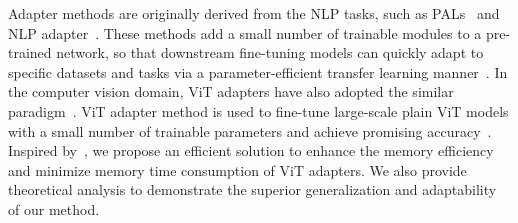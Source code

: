 Adapter methods are originally derived from the NLP tasks, such as PALs~\citep{stickland2019bert} and NLP adapter~\citep{houlsby2019parameter}. These methods add a small number of trainable modules to a pre-trained network, so that downstream fine-tuning models can quickly adapt to specific datasets and tasks via a parameter-efficient transfer learning manner~\citep{hu2022lora,houlsby2019parameter,chen2022vision,shen2023survey}. In the computer vision domain, ViT adapters have also adopted the similar paradigm~\citep{jie2023fact,chen2022vision,shao2023deepfake,luo2023forgery}. 
ViT adapter method is used to fine-tune large-scale plain ViT models with a small number of trainable parameters and achieve promising accuracy~\citep{jie2023fact,li2022exploring,chen2022vision}. 
Inspired by~\citep{he2023simplifying,jie2022convolutional,chen2022vision,liu2023efficientvit,mercea2024time}, we propose an efficient solution to enhance the memory efficiency and minimize memory time consumption of ViT adapters. We also provide theoretical analysis to demonstrate the superior generalization and adaptability of our method.

